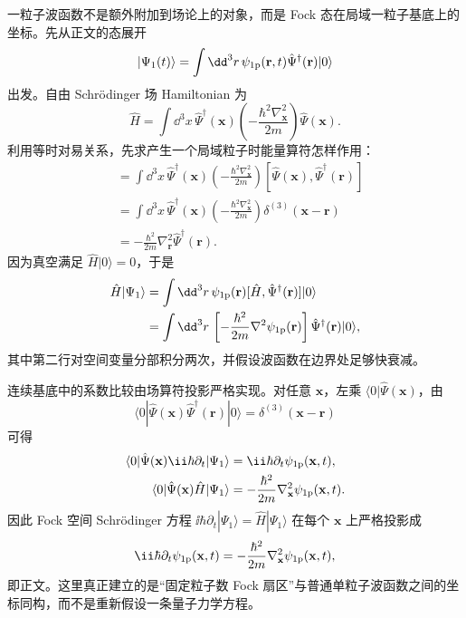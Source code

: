 
\begin{derivation}
一粒子波函数不是额外附加到场论上的对象，而是 Fock 态在局域一粒子基底上的坐标。先从正文的态展开
\begin{equation*}
|\Psi_1(t)\rangle
=\int\dd^3r\,\psi_{\rm 1p}(\mathbf r,t)
\hat\Psi^\dagger(\mathbf r)|0\rangle
\end{equation*}
出发。自由 Schr\"odinger 场 Hamiltonian 为
\begin{equation*}
\hat H
=\int\dd^3x\,
\hat\Psi^\dagger(\mathbf x)
\left(-\frac{\hbar^2\nabla_{\mathbf x}^2}{2m}\right)
\hat\Psi(\mathbf x).
\end{equation*}
利用等时对易关系，先求产生一个局域粒子时能量算符怎样作用：
\begin{align*}
[\hat H,\hat\Psi^\dagger(\mathbf r)]
&=\int\dd^3x\,
\hat\Psi^\dagger(\mathbf x)
\left(-\frac{\hbar^2\nabla_{\mathbf x}^2}{2m}\right)
[\hat\Psi(\mathbf x),\hat\Psi^\dagger(\mathbf r)]\\
&=\int\dd^3x\,
\hat\Psi^\dagger(\mathbf x)
\left(-\frac{\hbar^2\nabla_{\mathbf x}^2}{2m}\right)
\delta^{(3)}(\mathbf x-\mathbf r)\\
&=-\frac{\hbar^2}{2m}\nabla_{\mathbf r}^2
\hat\Psi^\dagger(\mathbf r).
\end{align*}
因为真空满足 \(\hat H|0\rangle=0\)，于是
\begin{align*}
\hat H|\Psi_1\rangle
&=\int\dd^3r\,\psi_{\rm 1p}(\mathbf r)
[\hat H,\hat\Psi^\dagger(\mathbf r)]|0\rangle\\
&=\int\dd^3r\,
\left[-\frac{\hbar^2}{2m}\nabla^2\psi_{\rm 1p}(\mathbf r)\right]
\hat\Psi^\dagger(\mathbf r)|0\rangle,
\end{align*}
其中第二行对空间变量分部积分两次，并假设波函数在边界处足够快衰减。

连续基底中的系数比较由场算符投影严格实现。对任意 \(\mathbf x\)，左乘 \(\langle0|\hat\Psi(\mathbf x)\)，由
\begin{equation*}
\langle0|\hat\Psi(\mathbf x)
\hat\Psi^\dagger(\mathbf r)|0\rangle
=\delta^{(3)}(\mathbf x-\mathbf r)
\end{equation*}
可得
\begin{align*}
\langle0|\hat\Psi(\mathbf x)
\ii\hbar\partial_t|\Psi_1\rangle
&=\ii\hbar\partial_t\psi_{\rm 1p}(\mathbf x,t),\\
\langle0|\hat\Psi(\mathbf x)
\hat H|\Psi_1\rangle
&=-\frac{\hbar^2}{2m}\nabla_{\mathbf x}^2
\psi_{\rm 1p}(\mathbf x,t).
\end{align*}
因此 Fock 空间 Schr\"odinger 方程 \(\ii\hbar\partial_t|\Psi_1\rangle=\hat H|\Psi_1\rangle\) 在每个 \(\mathbf x\) 上严格投影成
\begin{equation*}
\ii\hbar\partial_t\psi_{\rm 1p}(\mathbf x,t)
=-\frac{\hbar^2}{2m}\nabla_{\mathbf x}^2\psi_{\rm 1p}(\mathbf x,t),
\end{equation*}
即正文。这里真正建立的是“固定粒子数 Fock 扇区”与普通单粒子波函数之间的坐标同构，而不是重新假设一条量子力学方程。
\end{derivation}
